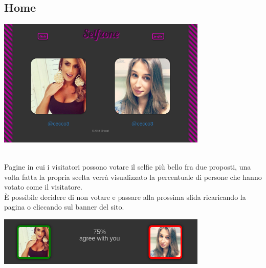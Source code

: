 \documentclass{article}
\begin{document}
\subsection{Home}
\begin{center}\includegraphics[width=0.75\textwidth]{res/home.png}\end{center}\\
Pagine in cui i visitatori possono votare il selfie più bello fra due proposti, una volta fatta la propria scelta verrà visualizzato la percentuale di persone che hanno votato come il visitatore.\\
\`E possibile decidere di non votare e passare alla prossima sfida ricaricando la pagina o cliccando sul banner del sito.\\
\begin{center}\includegraphics[width=0.75\textwidth]{res/home2.png}\end{center}
\end{document}
